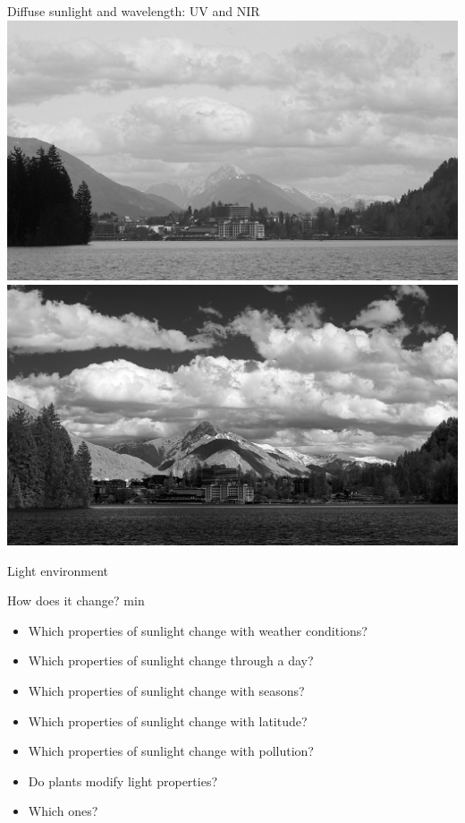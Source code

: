 \documentclass[10pt]{beamer}\usepackage[]{graphicx}\usepackage[]{color}
\begin{document}
\begin{frame}{Diffuse sunlight and wavelength: UV and NIR}
  \centering
  \includegraphics[height = 0.44\textheight]{photos/Bled-UVA}\\
  \includegraphics[height = 0.44\textheight]{photos/Bled-NIR}
\end{frame}

\begin{frame}{Light environment \Discussion}
\begin{block}{How does it change?  min}
    \begin{itemize}
      \item Which properties of sunlight change with weather conditions?
      \item Which properties of sunlight change through a day?
      \item Which properties of sunlight change with seasons?
      \item Which properties of sunlight change with latitude?
      \item Which properties of sunlight change with pollution?
      \item Do plants modify light properties?
      \item Which ones?
    \end{itemize}
\end{block}

\end{frame}
\end{document}
